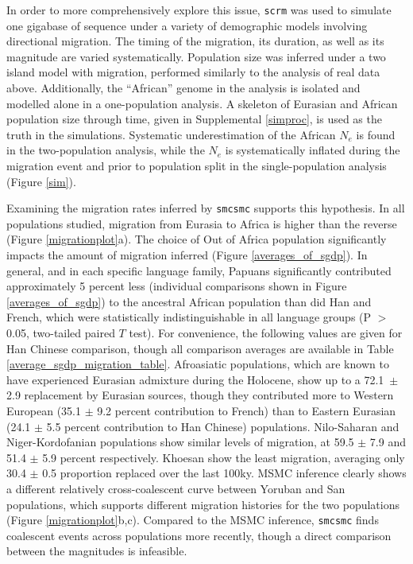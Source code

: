 \documentclass{article}
\begin{document}
In order to more comprehensively explore this issue, {\tt scrm} was used to simulate one gigabase of sequence under a variety of demographic models involving directional migration. The timing of the migration, its duration, as well as its magnitude are varied systematically. Population size was inferred under a two island model with migration, performed similarly to the analysis of real data above. Additionally, the ``African'' genome in the analysis is isolated and modelled alone in a one-population analysis. A skeleton of Eurasian and African population size through time, given in Supplemental \ref{simproc}, is used as the truth in the simulations. Systematic underestimation of the African $N_e$ is found in the two-population analysis, while the $N_e$ is systematically inflated during the migration event and prior to population split in the single-population analysis (Figure \ref{sim}). 

Examining the migration rates inferred by {\tt smcsmc} supports this hypothesis. In all populations studied, migration from Eurasia to Africa is higher than the reverse (Figure \ref{migrationplot}a). The choice of Out of Africa population significantly impacts the amount of migration inferred (Figure \ref{averages_of_sgdp}). In general, and in each specific language family, Papuans significantly contributed approximately 5 percent less (individual comparisons shown in Figure \ref{averages_of_sgdp}) to the ancestral African population than did Han and French, which were statistically indistinguishable in all language groups (P $>$ 0.05, two-tailed paired $T$ test). For convenience, the following values are given for Han Chinese comparison, though all comparison averages are available in Table \ref{average_sgdp_migration_table}. Afroasiatic populations, which are known to have experienced Eurasian admixture during the Holocene, show up to a 72.1\ $\pm$ 2.9 replacement by Eurasian sources, though they contributed more to Western European (35.1 $\pm$ 9.2 percent contribution to French) than to Eastern Eurasian (24.1 $\pm$ 5.5 percent contribution to Han Chinese) populations. Nilo-Saharan and Niger-Kordofanian  populations show similar levels of migration, at 59.5 $\pm$ 7.9 and 51.4 $\pm$ 5.9 percent respectively. Khoesan show the least migration, averaging only 30.4 $\pm$ 0.5 proportion replaced over the last 100ky. MSMC inference clearly shows a different relatively cross-coalescent curve between Yoruban and San populations, which supports different migration histories for the two populations (Figure \ref{migrationplot}b,c). Compared to the MSMC inference, {\tt smcsmc} finds coalescent events across populations more recently, though a direct comparison between the magnitudes is infeasible. 
\end{document}
